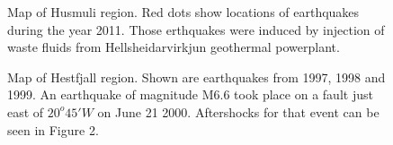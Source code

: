 \documentclass[extra]{gji}
\begin{document}
\begin{figure}
	\caption{
		Map of Husmuli region. Red dots show locations of earthquakes during the year 2011.
		Those erthquakes were induced by injection of waste fluids from Hellsheidarvirkjun geothermal
		powerplant.
		}
\end{figure}

\begin{figure}
	\caption{
		Map of Hestfjall region. Shown are earthquakes from 1997, 1998 and 1999. 
		An earthquake of magnitude M6.6 took place on a fault just east of $20 ^ o 45' W$ on
		June 21 2000. Aftershocks for that event can be seen in Figure 2.
		}
\end{figure}
\end{document}
